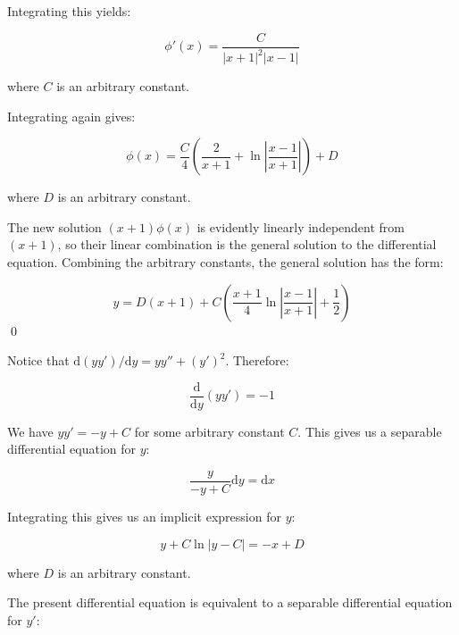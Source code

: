 \documentclass[12pt]{article}
\begin{document}
Integrating this yields:

\begin{equation}
    \phi'(x) = \frac{C}{\left\lvert x + 1 \right\rvert^{2} \left\lvert x - 1 \right\rvert}
\end{equation}

where $C$ is an arbitrary constant.

Integrating again gives:

\begin{equation}
    \phi(x) = \frac{C}{4} \left( \frac{2}{x + 1} + \ln{\left\lvert \frac{x - 1}{x + 1} \right\rvert} \right) + D
\end{equation}

where $D$ is an arbitrary constant.

The new solution $(x + 1)\phi(x)$ is evidently linearly independent from $(x + 1)$, so their linear combination is the general solution to the differential equation. Combining the arbitrary constants, the general solution has the form:

\begin{equation}
    y = D(x + 1) + C \left( \frac{x + 1}{4} \ln{\left\lvert \frac{x - 1}{x + 1} \right\rvert} + \frac{1}{2} \right)
\end{equation}
\qed



Notice that $\mathrm{d}(yy')/\mathrm{d}y = yy'' + (y')^{2}$. Therefore:

\begin{equation}
    \frac{\mathrm{d}}{\mathrm{d}y} (yy') = -1
\end{equation}

We have $yy' = -y + C$ for some arbitrary constant $C$. This gives us a separable differential equation for $y$:

\begin{equation}
    \frac{y}{-y + C} \mathrm{d}y = \mathrm{d}x
\end{equation}

Integrating this gives us an implicit expression for $y$:

\begin{equation}
    y + C \ln{\left\lvert y - C \right\rvert} = -x + D
\end{equation}

where $D$ is an arbitrary constant.

The present differential equation is equivalent to a separable differential equation for $y'$:
\end{document}
